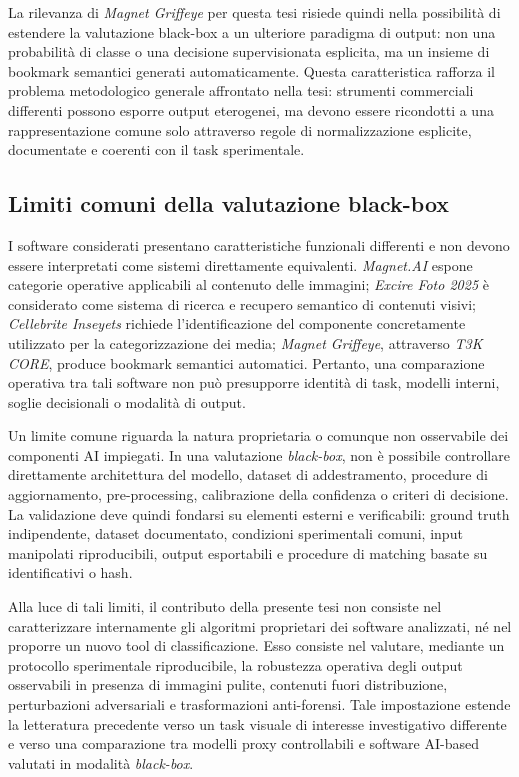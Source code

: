 La rilevanza di \textit{Magnet Griffeye} per questa tesi risiede quindi nella
possibilità di estendere la valutazione black-box a un ulteriore paradigma di
output: non una probabilità di classe o una decisione supervisionata esplicita,
ma un insieme di bookmark semantici generati automaticamente. Questa
caratteristica rafforza il problema metodologico generale affrontato nella
tesi: strumenti commerciali differenti possono esporre output eterogenei, ma
devono essere ricondotti a una rappresentazione comune solo attraverso regole di
normalizzazione esplicite, documentate e coerenti con il task sperimentale.



\subsection{Limiti comuni della valutazione black-box}
\label{subsec:sota_black_box_limits}

I software considerati presentano caratteristiche funzionali differenti e non
devono essere interpretati come sistemi direttamente equivalenti.
\textit{Magnet.AI} espone categorie operative applicabili al contenuto delle
immagini; \textit{Excire Foto 2025} è considerato come sistema di ricerca e
recupero semantico di contenuti visivi; \textit{Cellebrite Inseyets} richiede
l'identificazione del componente concretamente utilizzato per la
categorizzazione dei media; \textit{Magnet Griffeye}, attraverso
\textit{T3K CORE}, produce bookmark semantici automatici. Pertanto, una
comparazione operativa tra tali software non può presupporre identità di task,
modelli interni, soglie decisionali o modalità di output.


Un limite comune riguarda la natura proprietaria o comunque non osservabile dei componenti AI impiegati. In una valutazione \textit{black-box}, non è possibile controllare direttamente architettura del modello, dataset di addestramento, procedure di aggiornamento, pre-processing, calibrazione della confidenza o criteri di decisione. La validazione deve quindi fondarsi su elementi esterni e verificabili: ground truth indipendente, dataset documentato, condizioni sperimentali comuni, input manipolati riproducibili, output esportabili e procedure di matching basate su identificativi o hash.

Alla luce di tali limiti, il contributo della presente tesi non consiste nel caratterizzare internamente gli algoritmi proprietari dei software analizzati, né nel proporre un nuovo tool di classificazione. Esso consiste nel valutare, mediante un protocollo sperimentale riproducibile, la robustezza operativa degli output osservabili in presenza di immagini pulite, contenuti fuori distribuzione, perturbazioni adversariali e trasformazioni anti-forensi. Tale impostazione estende la letteratura precedente verso un task visuale di interesse investigativo differente e verso una comparazione tra modelli proxy controllabili e software AI-based valutati in modalità \textit{black-box}.


